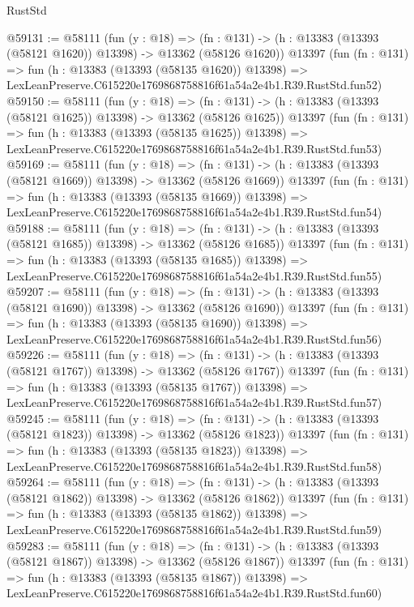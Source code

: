 \begin{lexlean}{RustStd}
\begin{coremodule}
@59131 := @58111
    (fun (y : @18) =>
    (fn : @131) -> (h : @13383 (@13393 (@58121 @1620)) @13398) -> @13362 (@58126 @1620))
    @13397
    (fun (fn : @131) =>
    fun (h : @13383 (@13393 (@58135 @1620)) @13398) =>
    LexLeanPreserve.C615220e1769868758816f61a54a2e4b1.R39.RustStd.fun52)
@59150 := @58111
    (fun (y : @18) =>
    (fn : @131) -> (h : @13383 (@13393 (@58121 @1625)) @13398) -> @13362 (@58126 @1625))
    @13397
    (fun (fn : @131) =>
    fun (h : @13383 (@13393 (@58135 @1625)) @13398) =>
    LexLeanPreserve.C615220e1769868758816f61a54a2e4b1.R39.RustStd.fun53)
@59169 := @58111
    (fun (y : @18) =>
    (fn : @131) -> (h : @13383 (@13393 (@58121 @1669)) @13398) -> @13362 (@58126 @1669))
    @13397
    (fun (fn : @131) =>
    fun (h : @13383 (@13393 (@58135 @1669)) @13398) =>
    LexLeanPreserve.C615220e1769868758816f61a54a2e4b1.R39.RustStd.fun54)
@59188 := @58111
    (fun (y : @18) =>
    (fn : @131) -> (h : @13383 (@13393 (@58121 @1685)) @13398) -> @13362 (@58126 @1685))
    @13397
    (fun (fn : @131) =>
    fun (h : @13383 (@13393 (@58135 @1685)) @13398) =>
    LexLeanPreserve.C615220e1769868758816f61a54a2e4b1.R39.RustStd.fun55)
@59207 := @58111
    (fun (y : @18) =>
    (fn : @131) -> (h : @13383 (@13393 (@58121 @1690)) @13398) -> @13362 (@58126 @1690))
    @13397
    (fun (fn : @131) =>
    fun (h : @13383 (@13393 (@58135 @1690)) @13398) =>
    LexLeanPreserve.C615220e1769868758816f61a54a2e4b1.R39.RustStd.fun56)
@59226 := @58111
    (fun (y : @18) =>
    (fn : @131) -> (h : @13383 (@13393 (@58121 @1767)) @13398) -> @13362 (@58126 @1767))
    @13397
    (fun (fn : @131) =>
    fun (h : @13383 (@13393 (@58135 @1767)) @13398) =>
    LexLeanPreserve.C615220e1769868758816f61a54a2e4b1.R39.RustStd.fun57)
@59245 := @58111
    (fun (y : @18) =>
    (fn : @131) -> (h : @13383 (@13393 (@58121 @1823)) @13398) -> @13362 (@58126 @1823))
    @13397
    (fun (fn : @131) =>
    fun (h : @13383 (@13393 (@58135 @1823)) @13398) =>
    LexLeanPreserve.C615220e1769868758816f61a54a2e4b1.R39.RustStd.fun58)
@59264 := @58111
    (fun (y : @18) =>
    (fn : @131) -> (h : @13383 (@13393 (@58121 @1862)) @13398) -> @13362 (@58126 @1862))
    @13397
    (fun (fn : @131) =>
    fun (h : @13383 (@13393 (@58135 @1862)) @13398) =>
    LexLeanPreserve.C615220e1769868758816f61a54a2e4b1.R39.RustStd.fun59)
@59283 := @58111
    (fun (y : @18) =>
    (fn : @131) -> (h : @13383 (@13393 (@58121 @1867)) @13398) -> @13362 (@58126 @1867))
    @13397
    (fun (fn : @131) =>
    fun (h : @13383 (@13393 (@58135 @1867)) @13398) =>
    LexLeanPreserve.C615220e1769868758816f61a54a2e4b1.R39.RustStd.fun60)

\end{coremodule}
\end{lexlean}
